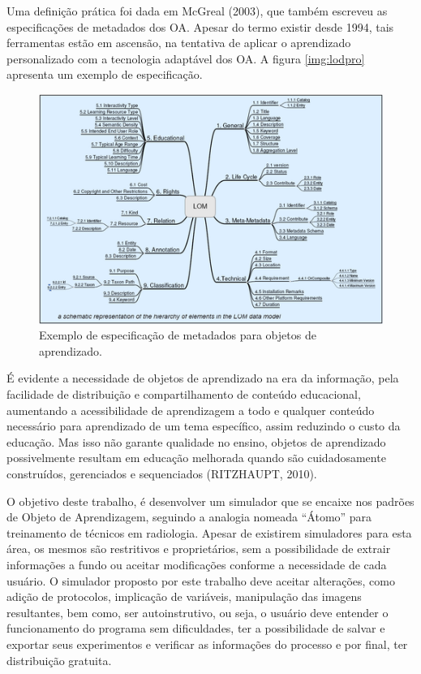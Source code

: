 \documentclass[12pt,openright,oneside,a4paper,english,french,spanish,brazil]{unifil}
\begin{document}
\par Uma definição prática foi dada em McGreal (2003), que também escreveu as especificações de metadados dos OA. Apesar do termo existir desde 1994, tais ferramentas estão em ascensão, na tentativa de aplicar o aprendizado personalizado com a tecnologia adaptável dos OA. {A figura \ref{img:lodpro} apresenta um exemplo de especificação}.
	\begin{figure}[htb]
	\centering
	\includegraphics[scale=0.8]{images/lom.png}
	\caption{Exemplo de especificação de metadados para objetos de aprendizado.}
	\label{img:lom}
\end{figure}
\par É evidente a necessidade de objetos de aprendizado na era da informação, pela facilidade de distribuição e compartilhamento de conteúdo educacional, aumentando a acessibilidade de aprendizagem a todo e qualquer conteúdo necessário para aprendizado de um tema específico, assim reduzindo o custo da educação. Mas isso não garante qualidade no ensino, objetos de aprendizado possivelmente resultam em educação melhorada quando são cuidadosamente construídos, gerenciados e sequenciados (\uppercase{Ritzhaupt}, 2010).
\par O objetivo deste trabalho, é desenvolver um simulador que se encaixe nos padrões de Objeto de Aprendizagem, seguindo a analogia nomeada ``Átomo'' para treinamento de técnicos em radiologia. Apesar de existirem simuladores para esta área, os mesmos são restritivos e proprietários, sem a possibilidade de extrair informações a fundo ou aceitar modificações conforme a necessidade de cada usuário. O simulador proposto por este trabalho deve aceitar alterações, como adição de protocolos, implicação de variáveis, manipulação das imagens resultantes, bem como, ser autoinstrutivo, ou seja, o usuário deve entender o funcionamento do programa sem dificuldades, ter a possibilidade de salvar e exportar seus experimentos e verificar as informações do processo e por final, ter distribuição gratuita.
\end{document}
